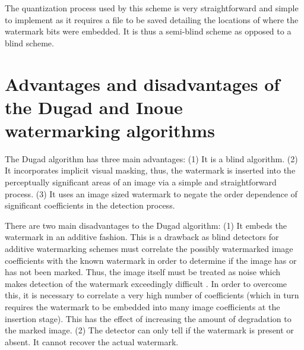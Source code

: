 \documentclass[10pt,twocolumn]{article}
\begin{document}
The quantization process used by this scheme is very straightforward and simple to implement
as it requires a file to be saved detailing the locations of where the watermark bits were
embedded. It is thus a semi-blind scheme as opposed to a blind scheme.


\section{Advantages and disadvantages of the Dugad and Inoue watermarking algorithms}
The Dugad algorithm has three main advantages:
(1) It is a blind algorithm. 
(2) It incorporates implicit visual masking, thus, the watermark is inserted
into the perceptually significant areas of an image via a simple
and straightforward process.
(3) It uses an image sized watermark to 
negate the order dependence of significant coefficients in the detection process.

There are two main disadvantages to the Dugad algorithm:
(1) It embeds the watermark in an additive fashion.
This is a drawback as blind detectors for additive watermarking schemes must correlate the
possibly watermarked image coefficients with the known
watermark in order to determine if the image has or has not 
been marked. Thus, the image itself must be treated as noise 
which makes detection of the watermark exceedingly difficult \cite{meerwald}.
In order to overcome this, it is necessary to correlate a very high number
of coefficients (which in turn requires the watermark to be embedded into many
image coefficients at the insertion stage). This has the effect of 
increasing the amount of degradation
to the marked image.
(2) The detector can only tell if the watermark is
present or absent. It cannot recover the actual watermark.
\end{document}
